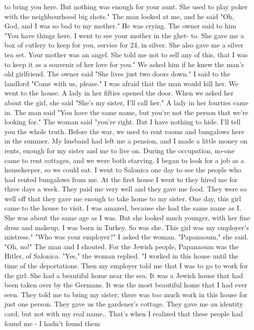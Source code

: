 to bring you here.
But nothing was enough for your aunt.
She used to play poker with 
the neighbourhood big shots."
The man looked at me, and he said "Oh, God, and I was so bad to my mother."
He was 
crying.
The owner said to him "You have things here.
I went to see your mother in the ghet-
to.
She gave me a box of cutlery to keep for you, service for 24, in silver.
She also 
gave me a silver tea set.
Your mother was an angel.
She told me not to sell any of 
this, that I was to keep it as a souvenir of her love for you."
We asked him if he knew the man's old girlfriend.
The owner said "She lives just 
two doors down."
I said to the landlord "Come with us, please."
I was afraid that the man would kill her.
We went to the house.
A lady in her fifties opened the door.
When we asked her 
about the girl, she said "She's my sister, I'll call her."
A lady in her fourties 
came in.
The man said "You have the same name, but you're not the person that we're 
looking for."
The woman said "you're right.
But I have nothing to hide.
I'll tell you the whole 
truth.
Before the war, we used to rent rooms and bungalows here in the summer.
My 
husband had left me a pension, and I made a little money on rents, enough for my sister 
and me to live on.
During the occupation, no-one came to rent cottages, and we were 
both starving.
I began to look for a job as a housekeeper, so we could eat.
I went to 
Salonica one day to see the people who had rented bungalows from me.
At the first house 
I went to they hired me for three days a week.
They paid me very well and they gave me 
food.
They were so well off that they gave me enough to take home to my sister.
One day, this girl came to the house to visit.
I was amazed, because she had the 
same name as I. She was about the same age as I was.
But she looked much younger, with her fine dress and makeup.
I was born in Turkey.
So was she.
This girl was 
my employer's mistress."
"Who was your employer?"
I asked the woman.
"Papanaoum," she said.
"Oh, no!"
The man and I shouted.
For the Jewish people, Papanaoum was the Hitler, 
of Salonica.
"Yes," the woman replied.
"I worked in this house until the time of the deportations.
Then my employer told me that I was to go to work for the girl.
She had a beautiful home near the sea.
It was a Jewish house that had been taken over by the Germans.
It was the most beautiful home that I had ever seen.
They told me to bring my sister; 
there was too much work in this house for just one person.
They gave us the gardener's cottage.
They gave me an identity card, but not with my real name.. That's when I realized that these people had found me - I hadn't found them 
